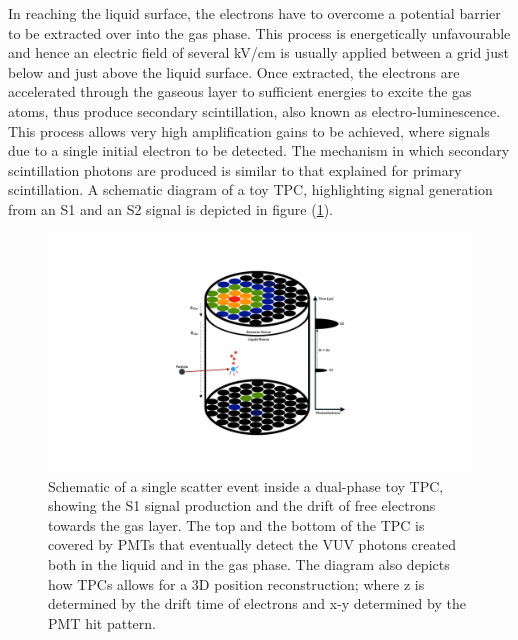 In reaching the liquid surface, the electrons have to overcome a potential barrier to be extracted over into the gas phase. This process is energetically unfavourable and hence an electric field of several kV/cm is usually applied between a grid just below and just above the liquid surface. Once extracted, the electrons are accelerated through the gaseous layer to sufficient energies to excite the gas atoms, thus produce secondary scintillation, also known as electro-luminescence. This process allows very high amplification gains to be achieved, where signals due to a single initial electron to be detected. The mechanism in which secondary scintillation photons are produced is similar to that explained for primary scintillation. A schematic diagram of a toy TPC, highlighting signal generation from an S1 and an S2 signal is depicted in figure (\ref{fig:tpc_diagram}). 
%
\begin{figure}[hb!]
    \begin{center}
        \includegraphics[scale=0.30]{Chapter_2/Figures/TPC_Diagram.pdf}
        \caption[Schematic of a single scatter event inside a dual-phase toy TPC, showing the S1 signal production and the drift of free electrons towards the gas layer]%
        {Schematic of a single scatter event inside a dual-phase toy TPC, showing the S1 signal production and the drift of free electrons towards the gas layer. The top and the bottom of the TPC is covered by PMTs that eventually detect the VUV photons created both in the liquid and in the gas phase. The diagram also depicts how TPCs allows for a 3D position reconstruction; where z is determined by the drift time of electrons and x-y determined by the PMT hit pattern.}
        \label{fig:tpc_diagram}
        \end{center}
\end{figure}
%

